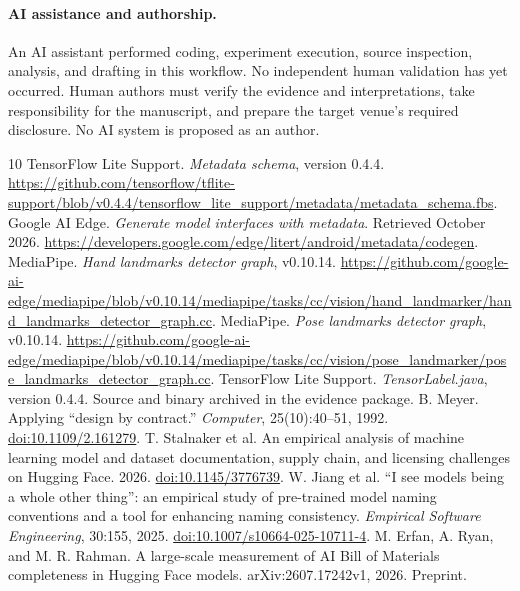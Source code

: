 \documentclass[10pt,twocolumn,letterpaper]{article}
\begin{document}
\paragraph{AI assistance and authorship.}
An AI assistant performed coding, experiment execution, source inspection, analysis, and drafting in this workflow. No independent human validation has yet occurred. Human authors must verify the evidence and interpretations, take responsibility for the manuscript, and prepare the target venue's required disclosure. No AI system is proposed as an author.

\begin{thebibliography}{10}\small
{} TensorFlow Lite Support. \emph{Metadata schema}, version 0.4.4. \url{https://github.com/tensorflow/tflite-support/blob/v0.4.4/tensorflow_lite_support/metadata/metadata_schema.fbs}.
 Google AI Edge. \emph{Generate model interfaces with metadata}. Retrieved October 2026. \url{https://developers.google.com/edge/litert/android/metadata/codegen}.
 MediaPipe. \emph{Hand landmarks detector graph}, v0.10.14. \url{https://github.com/google-ai-edge/mediapipe/blob/v0.10.14/mediapipe/tasks/cc/vision/hand_landmarker/hand_landmarks_detector_graph.cc}.
 MediaPipe. \emph{Pose landmarks detector graph}, v0.10.14. \url{https://github.com/google-ai-edge/mediapipe/blob/v0.10.14/mediapipe/tasks/cc/vision/pose_landmarker/pose_landmarks_detector_graph.cc}.
 TensorFlow Lite Support. \emph{TensorLabel.java}, version 0.4.4. Source and binary archived in the evidence package.
 B. Meyer. Applying ``design by contract.'' \emph{Computer}, 25(10):40--51, 1992. \href{https://doi.org/10.1109/2.161279}{doi:10.1109/2.161279}.
 T. Stalnaker et al. An empirical analysis of machine learning model and dataset documentation, supply chain, and licensing challenges on Hugging Face. 2026. \href{https://doi.org/10.1145/3776739}{doi:10.1145/3776739}.
 W. Jiang et al. ``I see models being a whole other thing'': an empirical study of pre-trained model naming conventions and a tool for enhancing naming consistency. \emph{Empirical Software Engineering}, 30:155, 2025. \href{https://doi.org/10.1007/s10664-025-10711-4}{doi:10.1007/s10664-025-10711-4}.
 M. Erfan, A. Ryan, and M. R. Rahman. A large-scale measurement of AI Bill of Materials completeness in Hugging Face models. arXiv:2607.17242v1, 2026. Preprint.
\end{thebibliography}
\end{document}

